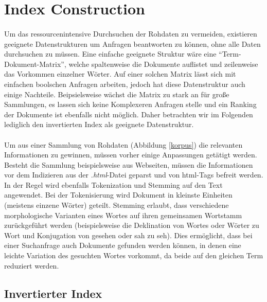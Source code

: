 \section{Index Construction} \label{IndexConstruction}
\paragraph{}
Um das ressourcenintensive Durchsuchen der Rohdaten zu vermeiden, existieren geeignete Datenstrukturen um Anfragen beantworten zu können, ohne alle Daten durchsuchen zu müssen. Eine einfache geeignete Struktur wäre eine \enquote{Term-Dokument-Matrix}, welche spaltenweise die Dokumente auflistet und zeilenweise das Vorkommen einzelner Wörter. Auf einer solchen Matrix lässt sich mit einfachen boolschen Anfragen arbeiten, jedoch hat diese Datenstruktur auch einige Nachteile. Beipsielsweise wächst die Matrix zu stark an für große Sammlungen, es lassen sich keine Komplexeren Anfragen stelle und ein Ranking der Dokumente ist ebenfalls nicht möglich. Daher betrachten wir im Folgenden lediglich den invertierten Index als geeignete Datenstruktur.
\par

\paragraph{}
Um aus einer Sammlung von Rohdaten (Abbildung \ref{korpus}) die relevanten Informationen zu gewinnen, müssen vorher einige Anpassungen getätigt werden. Besteht die Sammlung beispielsweise aus Webseiten, müssen die Informationen vor dem Indizieren aus der \textit{.html}-Datei geparst und von html-Tags befreit werden. In der Regel wird ebenfalls Tokenization und Stemming auf den Text angewendet. Bei der Tokenisierung wird Dokument in kleinste Einheiten (meistens einzene Wörter) geteilt. Stemming erlaubt, dass verschiedene morphologische Varianten eines Wortes auf ihren gemeinsamen Wortstamm zurückgeführt werden (beispielsweise die Deklination von Wortes oder Wörter zu Wort und Konjugation von gesehen oder sah zu seh). Dies ermöglicht, dass bei einer Suchanfrage auch Dokumente gefunden werden können, in denen eine leichte Variation des gesuchten Wortes vorkommt, da beide auf den gleichen Term reduziert werden.
\par

\subsection{Invertierter Index} \label{invertedIndex}
